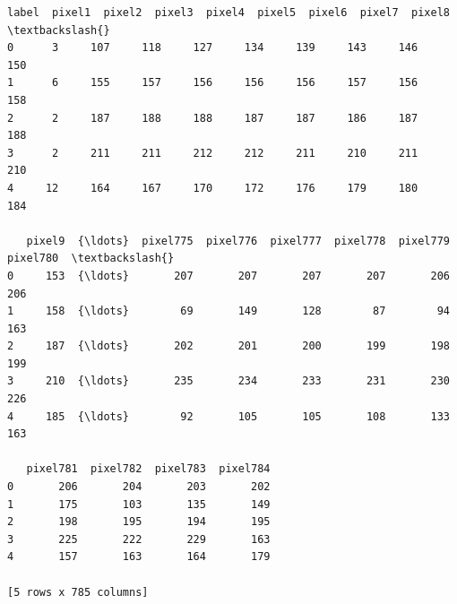 \documentclass[11pt]{article}
\makeatletter
\newcommand{\boxspacing}{\kern\kvtcb@left@rule\kern\kvtcb@boxsep}
\newcommand{\prompt}[4]{
        {\ttfamily\llap{{\color{#2}[#3]:\hspace{3pt}#4}}\vspace{-\baselineskip}}
    }
\makeatother
\begin{document}
            \begin{tcolorbox}[breakable, size=fbox, boxrule=.5pt, pad at break*=1mm, opacityfill=0]
\prompt{Out}{outcolor}{36}{\boxspacing}
\begin{Verbatim}[commandchars=\\\{\}]
   label  pixel1  pixel2  pixel3  pixel4  pixel5  pixel6  pixel7  pixel8  \textbackslash{}
0      3     107     118     127     134     139     143     146     150
1      6     155     157     156     156     156     157     156     158
2      2     187     188     188     187     187     186     187     188
3      2     211     211     212     212     211     210     211     210
4     12     164     167     170     172     176     179     180     184

   pixel9  {\ldots}  pixel775  pixel776  pixel777  pixel778  pixel779  pixel780  \textbackslash{}
0     153  {\ldots}       207       207       207       207       206       206
1     158  {\ldots}        69       149       128        87        94       163
2     187  {\ldots}       202       201       200       199       198       199
3     210  {\ldots}       235       234       233       231       230       226
4     185  {\ldots}        92       105       105       108       133       163

   pixel781  pixel782  pixel783  pixel784
0       206       204       203       202
1       175       103       135       149
2       198       195       194       195
3       225       222       229       163
4       157       163       164       179

[5 rows x 785 columns]
\end{Verbatim}
\end{tcolorbox}
        
\end{document}
